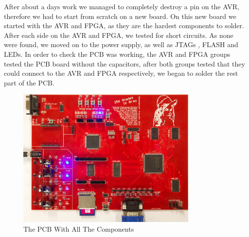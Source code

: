 After about a days work we managed to completely destroy a pin on the AVR, therefore we had to start from scratch on a new board. On this new board we started with the AVR and FPGA, as they are the hardest components to solder. After each side on the AVR and FPGA, we tested for short circuits. As none were found, we moved on to the power supply, as well as JTAGs , FLASH and LEDs. In order to check the PCB was working, the AVR and FPGA groups tested the PCB board without the capacitors, after both groups tested that they could connect to the AVR and FPGA respectively, we began to solder the rest part of the PCB. 
\begin{figure}[h]
  \centering
  \includegraphics[width=0.8\textwidth]{fig/pcb/pcbwithcomp}
  \caption{The PCB With All The Components}
  \label{fig:pcb}
\end{figure}